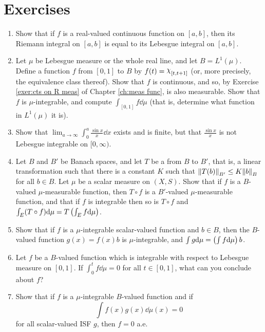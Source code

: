 \section{Exercises}
\begin{enumerate}[label=\arabic*),ref=\arabic*]
\item Show that if $f$ is a real-valued continuous function on $[a,b]$, then its Riemann integral on $[a,b]$ is equal to its Lebesgue integral on $[a,b]$.

\item\label{exer:integral of L1 func}
Let $\mu$ be Lebesgue measure or the whole real line, and let $B=L^1(\mu)$. Define a function $f$ from $[0,1]$ to $B$ by $f(t)=\idf{[t, t+1]}$ (or, more precisely, the equivalence class thereof). Show that $f$ is continuous, and so, by Exercise \ref{exer:cts on R meas} of Chapter \ref{ch:meas func}, is also measurable. Show that $f$ is $\mu$-integrable, and compute $\int_{[0,1]}f\dd\mu$ (that is, determine what function in $L^1(\mu)$ it is).

\item Show that $\lim _{a\to\infty}\int_0^a\frac{\sin x}{x}\dd x$ exists and is finite, but that $\frac{\sin x}{x}$ is not Lebesgue integrable on $[0,\infty)$.

\item\label{exer:integral compose linear functional}
Let $B$ and $B'$ be Banach spaces, and let $T$ be a  from $B$ to $B'$, that is, a linear transformation such that there is a constant $K$ such that $\norm{T(b)}_{B'}\leq K\norm{b}_B$ for all $b\in B$. Let $\mu$ be a scalar measure on $(X,S)$. Show that if $f$ is a $B$-valued $\mu$-measurable function, then $T\circ f$ is a $B'$-valued $\mu$-measurable function, and that if $f$ is integrable then so is $T\circ f$ and $\int_E(T\circ f)\dd\mu=T\left(\int_Ef\dd\mu\right)$.

\item Show that if $f$ is a $\mu$-integrable scalar-valued function and $b\in B$, then the $B$-valued function $g(x)=f(x)b$ is $\mu$-integrable, and $\int g\dd\mu=\left(\int f\dd\mu\right)b$.

\item Let $f$ be a $B$-valued function which is integrable with respect to Lebesgue measure on $[0,1]$. If $\int_0^t f\dd\mu=0$ for all $t\in[0,1]$, what can you conclude about $f$?

\item Show that if $f$ is a $\mu$-integrable $B$-valued function and if \[\int f(x)g(x)\dd\mu(x)=0\] for all scalar-valued ISF $g$, then $f=0$ a.e.


\end{enumerate}
